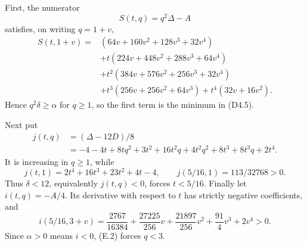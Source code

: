 \documentclass[10pt,a4paper]{amsart}
\theoremstyle{definition}
\theoremstyle{remark}
\begin{document}
First, the numerator
\[
S(t,q)=q^2\Delta-A
\]
satisfies, on writing \(q=1+v\),
\[
\begin{split}
S(t,1+v)={}&
(64v+160v^2+128v^3+32v^4)\\
&+t(224v+448v^2+288v^3+64v^4)\\
&+t^2(384v+576v^2+256v^3+32v^4)\\
&+t^3(256v+256v^2+64v^3)
+t^4(32v+16v^2).
\end{split}
\tag{E.1}
\]
Hence \(q^2\delta\geq\alpha\) for \(q\geq1\), so the first term is the
minimum in (D4.5).

Next put
\[
\begin{split}
j(t,q)&=(\Delta-12D)/8\\
&=-4-4t+8tq^2+3t^2+16t^2q+4t^2q^2
  +8t^3+8t^3q+2t^4.
\end{split}
\]
It is increasing in \(q\geq1\), while
\[
j(t,1)=2t^4+16t^3+23t^2+4t-4,\qquad
j(5/16,1)=113/32768>0.
\]
Thus \(\delta<12\), equivalently \(j(t,q)<0\), forces \(t<5/16\).
Finally let \(i(t,q)=-A/4\).  Its derivative with respect to \(t\) has
strictly negative coefficients, and
\[
i(5/16,3+v)=
\frac{2767}{16384}+\frac{27225}{256}v
+\frac{21897}{256}v^2+\frac{91}{4}v^3+2v^4>0.
\tag{E.2}
\]
Since \(\alpha>0\) means \(i<0\), (E.2) forces \(q<3\).
\end{document}
